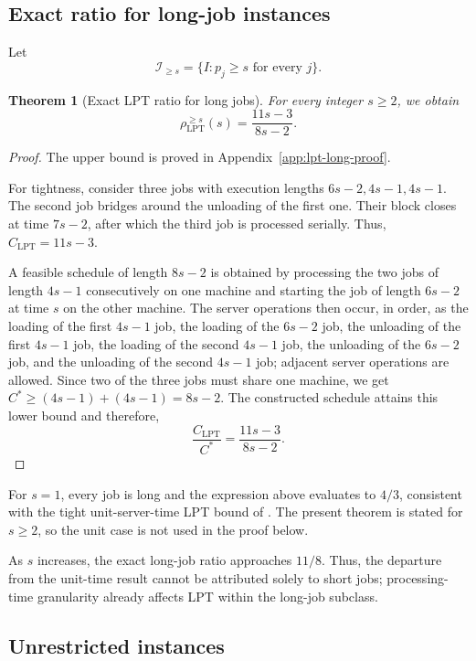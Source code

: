 \documentclass[11pt]{article}
\newtheorem{theorem}{Theorem}
\begin{document}
\subsection{Exact ratio for long-job instances}
\label{subsec:lpt-long-jobs}

Let
\[
\mathcal I_{\ge s}
=
\{I:p_j\ge s\text{ for every }j\}.
\]

\begin{theorem}[Exact LPT ratio for long jobs]
\label{thm:lpt-long-jobs}
For every integer \(s\ge2\), we obtain 
\[
\boxed{
\rho_{\mathrm{LPT}}^{\ge s}(s)
=
\frac{11s-3}{8s-2}.
}
\]
\end{theorem}

\begin{proof}
The upper bound is proved in Appendix~\ref{app:lpt-long-proof}.

For tightness, consider three jobs with execution lengths \(6s-2,4s-1,4s-1\).
The second job bridges around the unloading of the first one. Their block closes at time \(7s-2\), after which the third job is processed serially. Thus, \(C_{\mathrm{LPT}}=11s-3\).

A feasible schedule of length \(8s-2\) is obtained by processing the two jobs
of length \(4s-1\) consecutively on one machine and starting the job of length
\(6s-2\) at time \(s\) on the other machine. The server operations then occur, in
order, as the loading of the first \(4s-1\) job, the loading of the \(6s-2\) job,
the unloading of the first \(4s-1\) job, the loading of the second \(4s-1\) job,
the unloading of the \(6s-2\) job, and the unloading of the second \(4s-1\) job;
adjacent server operations are allowed. Since two of the three jobs must share one
machine, we get \(C^*\ge(4s-1)+(4s-1)=8s-2\).
The constructed schedule attains this lower bound and therefore,
\[
\frac{C_{\mathrm{LPT}}}{C^*}
=
\frac{11s-3}{8s-2}.
\]
\end{proof}

For \(s=1\), every job is long and the expression above evaluates to \(4/3\),
consistent with the tight unit-server-time LPT bound of
\citet{jiang2015_loading_unloading}. The present theorem is stated for \(s\ge2\), so
the unit case is not used in the proof below.

As \(s\) increases, the exact long-job ratio approaches \(11/8\). Thus, the
departure from the unit-time result cannot be attributed solely to short jobs;
processing-time granularity already affects LPT within the long-job subclass.

\subsection{Unrestricted instances}
\label{subsec:lpt-unrestricted}
\end{document}
